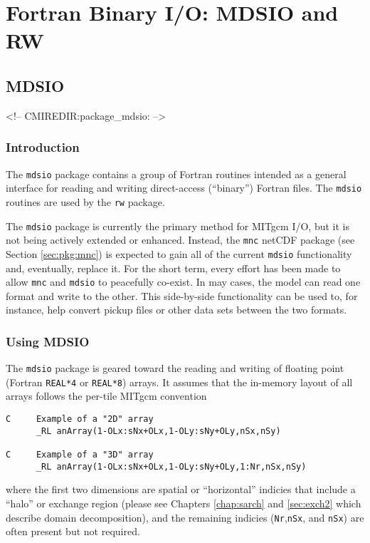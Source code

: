

\section{Fortran Binary I/O: MDSIO and RW}
\label{sec:mdsio_and_rw}


\subsection{MDSIO}
\label{sec:pkg:mdsio}
\begin{rawhtml}
<!-- CMIREDIR:package_mdsio: -->
\end{rawhtml}
\label{sec:pkg:rw}

\subsubsection{Introduction}
The \texttt{mdsio} package contains a group of Fortran routines
intended as a general interface for reading and writing direct-access
(``binary'') Fortran files.  The \texttt{mdsio} routines are used by
the \texttt{rw} package.

The \texttt{mdsio} package is currently the primary method for MITgcm
I/O, but it is not being actively extended or enhanced.  Instead, the
\texttt{mnc} netCDF package (see Section \ref{sec:pkg:mnc}) is
expected to gain all of the current \texttt{mdsio} functionality and,
eventually, replace it.  For the short term, every effort has been
made to allow \texttt{mnc} and \texttt{mdsio} to peacefully co-exist.
In may cases, the model can read one format and write to the other.
This side-by-side functionality can be used to, for instance, help
convert pickup files or other data sets between the two formats.


\subsubsection{Using MDSIO}
The \texttt{mdsio} package is geared toward the reading and writing of
floating point (Fortran \texttt{REAL*4} or \texttt{REAL*8}) arrays.
It assumes that the in-memory layout of all arrays follows the per-tile
MITgcm convention
\begin{verbatim}
C     Example of a "2D" array
      _RL anArray(1-OLx:sNx+OLx,1-OLy:sNy+OLy,nSx,nSy)

C     Example of a "3D" array
      _RL anArray(1-OLx:sNx+OLx,1-OLy:sNy+OLy,1:Nr,nSx,nSy)
\end{verbatim}
where the first two dimensions are spatial or ``horizontal'' indicies
that include a ``halo'' or exchange region (please see
Chapters \ref{chap:sarch} and \ref{sec:exch2} which describe domain
decomposition), and the remaining indicies (\texttt{Nr},\texttt{nSx},
and \texttt{nSx}) are often present but not required.

